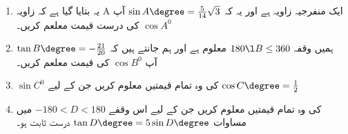 \begin{enumerate}
\item
یہ بتایا گیا ہے کہ زاویہ  A  ایک منفرجیہ زاویہ ہے اور یہ کہ \(\sin A\degree = \frac{5}{14}\sqrt{3}\) آپ \( \cos A  ^{0}\)  کی درست قیمت معلعم کریں۔
\item

ہمیں وقفہ   \(180\l B \le 360\) معلوم ہے اور ہم جانتے ہیں کہ \( \tan B\degree=-\frac{21}{20}\)   آپ \( \cos B  ^{0}\)  کی قیمت معلعم کریں۔
\item
  \( \sin C  ^{0}\)  کی وہ تمام قیمتیں معلوم کریں جن کے لیے  \(\cos C\degree=\frac{1}{2}\)

\item
کی وہ تمام قیمتیں معلوم کریں جن کے لیے اس وقفے  \(-180<D<180\) میں مساوات \(\tan D\degree=5\sin D\degree\) درست ثابت ہو۔                                                                                                                                                                                                                                                                                                                                                                                                                                                                                                                                                                                                                                                                                                                                                                                                                                                                                                                                                                                                                                                                                                                                                                                                                                                                                                                                                                                                                                                                                                                                                                                                                                                                                                                                                                                                                                                                                                                                                                                                                                                                                                                                                                                                                                                                                                                                                                                                                                                                                                                                           
\end{enumerate}
